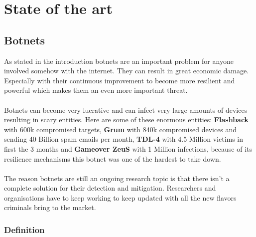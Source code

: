 
\chapter{State of the art}

\label{State of the art}

\section{Botnets}
As stated in the introduction botnets are an important problem for anyone involved somehow with the internet. They can result in great economic damage.
Especially with their continuous improvement to become more resilient and powerful which makes them an even more important threat.\\\\
Botnets can become very lucrative and can infect very large amounts of devices resulting in scary entities. Here are some of these enormous entities: \textbf{Flashback} with 600k compromised targets, \textbf{Grum} with 840k compromised devices and sending 40 Billion spam emails per month, \textbf{TDL-4} with 4.5 Million victims in first the 3 months and \textbf{Gameover ZeuS} with 1 Million infections, because of its resilience mechanisms this botnet was one of the hardest to take down.\\\\
The reason botnets are still an ongoing research topic is that there isn't a complete solution for their detection and mitigation. Researchers and organisations have to keep working to keep updated with all the new flavors criminals bring to the market.
\subsection{Definition}
